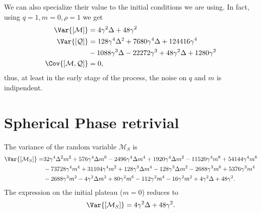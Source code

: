 We can also specialize their value to the initial conditions we are using.
In fact, using \(q=1, m=0, \rho=1\) we get
\[\begin{split}
  \Var{[\mathcal{M}]} &= 4 \gamma ^2 \Delta +48 \gamma ^2 \\
  \Var{[\mathcal{Q}]} &= 128 \gamma ^4 \Delta ^2+7680 \gamma ^4 \Delta +124416 \gamma ^4 \\
                      &-1088 \gamma ^3 \Delta -22272 \gamma ^3+48 \gamma ^2 \Delta +1280 \gamma ^2 \\
  \Cov{[\mathcal{M},\mathcal{Q}]} &= 0,
\end{split}\]
thus, at least in the early stage of the process, the noise on \(q\) and \(m\) is indipendent.

\section{Spherical Phase retrivial}
The variance of the random variable \(\mathcal{M}_S\) is
\[\begin{split}
  \Var{[\mathcal{M}_S]} =& 32 \gamma ^4 \Delta ^2 m^2+576 \gamma ^4 \Delta  m^6-2496 \gamma ^4 \Delta  m^4
                         +1920 \gamma ^4 \Delta  m^2-11520 \gamma ^4 m^8+54144 \gamma ^4 m^6\\
                         &-73728 \gamma ^4 m^4+31104 \gamma ^4 m^2+128 \gamma ^3 \Delta  m^4
                         -128 \gamma ^3 \Delta  m^2-2688 \gamma ^3 m^6+5376 \gamma ^3 m^4\\
                         &-2688 \gamma ^3 m^2-4 \gamma ^2 \Delta  m^2+80 \gamma ^2 m^6-112 \gamma ^2 m^4
                         -16 \gamma ^2 m^2+4 \gamma ^2 \Delta +48 \gamma ^2.
\end{split}\]
The expression on the initial plateau (\(m=0\)) reduces to
\[
  \Var{[\mathcal{M}_S]} = 4 \gamma ^2 \Delta +48 \gamma ^2.
\]